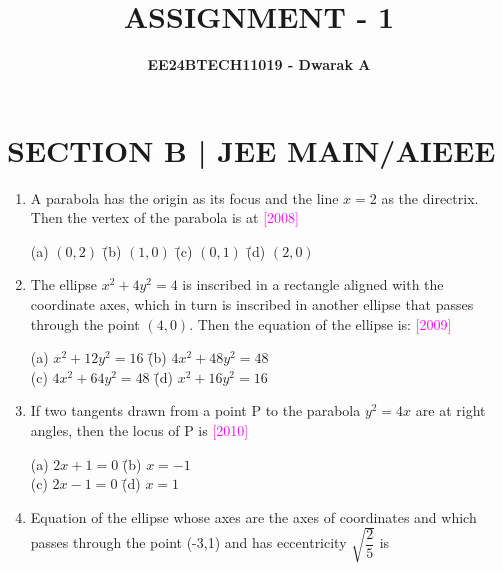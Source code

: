 \documentclass[journal,12pt,twocolumn]{IEEEtran}
\theoremstyle{remark}
\begin{document}

\vspace{3cm}

\title{\textbf{ASSIGNMENT - 1}}
\author{\textbf{EE24BTECH11019 - Dwarak A}}
\maketitle
\newpage
\bigskip

\renewcommand{\thefigure}{\theenumi}
\renewcommand{\thetable}{\theenumi}

\section*{\textbf{SECTION B | JEE MAIN/AIEEE}}
\bigskip

\begin{enumerate}[label=\textcolor{magenta}{\arabic*.}]
    \item A parabola has the origin as its focus and the line $x=2$ as the directrix. Then the vertex of the parabola is at
    \hfill{\textcolor{magenta}{[2008]}}

    \begin{tabbing}
        (a) $(0,2)$ \hspace{.8em} \= (b) $(1,0)$ \hspace{.8em} \= (c) $(0,1)$ \hspace{.8em} \= (d) $(2,0)$ \\
    \end{tabbing}
    \item The ellipse $x^2+4y^2=4$ is inscribed in a rectangle aligned with the coordinate axes, which in turn is inscribed in another ellipse that passes through the point $(4,0)$. Then the equation of the ellipse is:
    \hfill{\textcolor{magenta}{[2009]}}

    \begin{tabbing}
        (a) $x^2+12y^2=16$ \hspace{1.2em} \= (b) $4x^2+48y^2=48$ \\
        (c) $4x^2+64y^2=48$ \hspace{0.7em} \= (d) $x^2+16y^2=16$ \\
    \end{tabbing}
    \item If two tangents drawn from a point P to the parabola $y^2=4x$ are at right angles, then the locus of P is
    \hfill{\textcolor{magenta}{[2010]}}
    
    \begin{tabbing}
        (a) $2x+1=0$ \hspace{3.2em} \= (b) $x=-1$ \\
        (c) $2x-1=0$ \hspace{3.2em} \= (d) $x=1$ \\
    \end{tabbing}
    \item Equation of the ellipse whose axes are the axes of coordinates and which passes through the point (-3,1) and has eccentricity $\sqrt{\dfrac{2}{5}}$ is
    

\end{enumerate}
\end{document}
